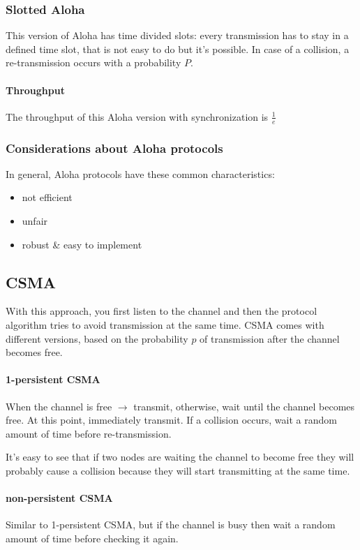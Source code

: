 \subsubsection{Slotted Aloha}

This version of Aloha has time divided slots: every transmission has to stay in
a defined time slot, that is not easy to do but it's possible. In case of a
collision, a re-transmission occurs with a probability $P$.

\paragraph*{Throughput} The throughput of this Aloha version with
synchronization is $\frac{1}{e}$

\subsubsection{Considerations about Aloha protocols}

In general, Aloha protocols have these common characteristics:
\begin{itemize}
\item not efficient
\item unfair
\item robust \& easy to implement
\end{itemize}

\subsection{CSMA}

With this approach, you first listen to the channel and then the protocol
algorithm tries to avoid transmission at the same time. CSMA comes with
different versions, based on the probability $p$ of transmission after the
channel becomes free.

\paragraph*{1-persistent CSMA} When the channel is free $\to$ transmit,
otherwise, wait until the channel becomes free. At this point, immediately
transmit. If a collision occurs, wait a random amount of time before
re-transmission.

It's easy to see that if two nodes are waiting the channel to become free they
will probably cause a collision because they will start transmitting at the
same time.

\paragraph*{non-persistent CSMA} Similar to 1-persistent CSMA, but if the
channel is busy then wait a random amount of time before checking it again.

